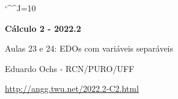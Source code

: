 \documentclass[oneside,12pt]{article}
\begin{document}
\catcode`\^^J=10
\pu
\def\pictgridstyle{\color{GrayPale}\linethickness{0.3pt}}
\def\pictaxesstyle{\linethickness{0.5pt}}
\def\pictnaxesstyle{\color{GrayPale}\linethickness{0.5pt}}
\celllower=2.5pt


\def\u#1{\par{\footnotesize \url{#1}}}

\def\drafturl{http://angg.twu.net/LATEX/2022-2-C2.pdf}
\def\drafturl{http://angg.twu.net/2022.2-C2.html}
\def\draftfooter{\tiny \href{\drafturl}{\jobname{}} \ColorBrown{\shorttoday{} \hours}}



%

\thispagestyle{empty}

\begin{center}

\vspace*{1.2cm}

{\bf \Large Cálculo 2 - 2022.2}

\bsk

Aulas 23 e 24: EDOs com variáveis separáveis

\bsk

Eduardo Ochs - RCN/PURO/UFF

\url{http://angg.twu.net/2022.2-C2.html}

\end{center}

\newpage


\end{document}
